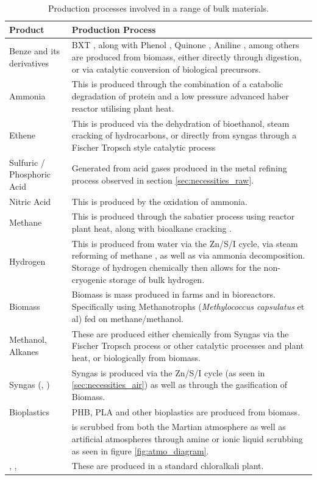 \documentclass[fleqn,10pt]{Stylesheet} %
\begin{document}
\begin{table}[t]

\centering
\begin{tabular}{|m{4cm}|L|}\hline
\textbf{Product} & \textbf{Production Process} \\\hline
Benze and its derivatives &	BXT \cite{QingfengChe2019}, along with Phenol \cite{2001Gibson}, Quinone \cite{NingqingRan2001}, Aniline \cite{Pharkya2020}, among others \cite{JianLi2017} are produced from biomass, either directly through digestion, or via catalytic conversion of biological precursors. \\\hline
Ammonia & This is produced through the combination of a catabolic degradation of protein \cite{KwonYoungChoi2014} and a low pressure advanced haber reactor \cite{BosongLin2019} utilising plant heat.\\\hline
Ethene & This is produced via the dehydration of bioethanol, steam cracking of hydrocarbons, or directly from syngas through a Fischer Tropsch style catalytic process \\\hline
Sulfuric / Phosphoric Acid &  Generated from acid gases produced in the metal refining process observed in section \ref{sec:necessities_raw}. \\\hline
Nitric Acid & This is produced by the oxidation of ammonia.\\\hline
Methane & This is produced through the sabatier \cite{JohnBucknell2014} process using reactor plant heat, along with bioalkane cracking \cite{2004JoseComas, XWang2002}.\\\hline
Hydrogen &  This is produced from water via the Zn/S/I cycle, via steam reforming of methane \cite{JianhuaTong2006}, as well as via ammonia decomposition. Storage of hydrogen chemically then allows for the non-cryogenic storage of bulk hydrogen.\\\hline
Biomass & Biomass is mass produced in farms and in bioreactors. Specifically using Methanotrophs (\textit{Methylococcus capsulatus} et al) fed on methane/methanol. \\\hline
Methanol, Alkanes & These are produced either chemically from Syngas via the Fischer Tropsch process or other catalytic processes and plant heat, or biologically from biomass. \\\hline
Syngas (, ) & Syngas is produced via the Zn/S/I cycle (as seen in \ref{sec:necessities_air}) as well as through the gasification of Biomass. \\\hline
Bioplastics & PHB, PLA and other bioplastics are produced from biomass. \\\hline
{} &  is scrubbed from both the Martian atmosphere as well as artificial atmospheres through amine or ionic liquid scrubbing \cite{Lotto2018,StephenYates2016} as seen in figure \ref{fig:atmo_diagram}. \\\hline
{}, ,  & These are produced in a standard chloralkali plant. \\\hline
\end{tabular}
\caption{Production processes involved in a range of bulk materials.}
\label{tab:bulk_products}
\end{table}
\end{document}
